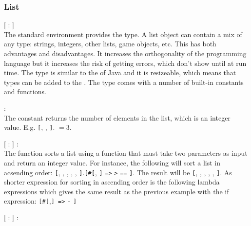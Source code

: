 \subsubsection{List}

\begin{dlist}
  \item {}[ : ]\\
    The standard environment provides the  type. A list object can
    contain a mix of any type: strings, integers, other lists, game objects,
    etc. This has both advantages and disadvantages. It increases the
    orthogonality of the programming language but it increases the risk of
    getting errors, which don't show until at run time. The  type is similar
    to the  of Java and it is resizeable, which means that
    types can be added to the . The type comes with a number of built-in
    constants and functions. 
  \item {} : \\
    The  constant returns the number of elements in the list,
    which is an integer value. E.g. \texttt{[}, ,
    \texttt{]}. $= 3$.
  \item {}[ : ] :  \\
    The  function sorts a list using a function that must take
    two parameters as input and return an integer value. For instance, the
    following will sort a list in acsending order:
    \texttt{[}, , , , ,
    \texttt{]}.\texttt{[}\texttt{\#[},
    \texttt{]} \texttt{=>}   \texttt{>}
         \texttt{==}
        \texttt{]}. 
    The result will be \texttt{[}, , ,
    , , \texttt{]}. 
    As shorter expression for sorting in ascending order is the following lambda
    expressions which gives the same result as the previous example with the if
    expression: \texttt{[\#[},\texttt{] =>} 
    \texttt{-} \texttt{]}
  \item {}[ : ] :  \\

\end{dlist}
